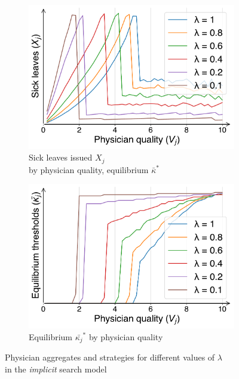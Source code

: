 \documentclass[../main.tex]{subfiles}
\begin{document}
\begin{figure}[H]
    \vspace{0.5cm}

    \begin{subfigure}[b]{0.46\linewidth}
        \centering
        \includegraphics[width=\linewidth]{X.pdf}
        \vspace{-0.6cm}
        \caption{Sick leaves issued $X_j$ \\ by physician quality, equilibrium $\bar{\kappa}^*$}
        \label{fig:LogitX}
    \end{subfigure}
    \hspace{0.05\linewidth}  %
    \begin{subfigure}[b]{0.46\linewidth}
        \centering
        \includegraphics[width=\linewidth]{ks.pdf}
        \vspace{-0.6cm}
        \caption{Equilibrium $\bar{\kappa_j}^*$ by physician quality \\ \text{}}
        \label{fig:Logitk}
    \end{subfigure}

    \caption{Physician aggregates and strategies for different values of $\lambda$ \\ in the \textit{implicit} search model}
    \label{fig:Logit}
\end{figure}
\end{document}
